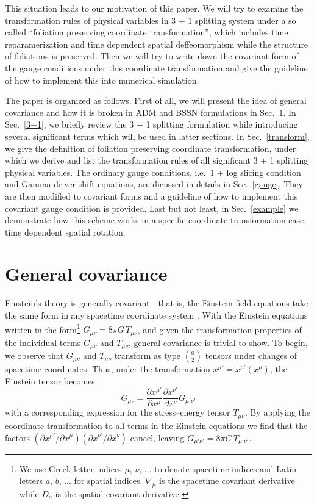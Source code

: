 \documentclass[letterpaper,nofootinbib,prd,amsmath,onecolumn]{revtex4-1}
\begin{document}
This situation leads to our motivation of this paper. We will try to examine the transformation rules of physical variables in 3 + 1 splitting system under a so called ``foliation preserving coordinate transformation'', which includes time reparamerization and time dependent spatial deffeomorphism while the structure of foliations is preserved. Then we will try to write down the covariant form of the gauge conditions under this coordinate transformation and give the guideline of how to implement this into numerical simulation. 

The paper is organized as follows. First of all, we will present the idea of general covariance and how it is broken in ADM and BSSN formulations in Sec.~\ref{covariance}. In Sec.~\ref{3+1}, we briefly review the 3 + 1 splitting formulation while introducing several significant terms which will be used in latter sections. In Sec.~\ref{transform}, we give the definition of foliation preserving coordinate transformation, under which we derive and list the transformation rules of all significant 3 + 1 splitting physical variables. The ordinary gauge conditions, i.e.~1 + log slicing condition and Gamma-driver shift equations, are dicussed in details in Sec.~\ref{gauge}. They are then modified to covariant forms and a guideline of how to implement this covariant gauge condition is provided. Last but not least, in Sec.~\ref{example} we demonstrate how this scheme works in a specific coordinate transformation case, time dependent spatial rotation.
\section{General covariance}\label{covariance}
Einstein's theory is generally covariant---that is, the Einstein field equations take the same 
form in any spacetime coordinate system \cite{Weinberg, Wald}. With the 
Einstein equations written in the form\footnote{We use Greek letter indices $\mu$, $\nu$, ... to denote spacetime indices and Latin 
letters $a$, $b$, ... for spatial indices. $\nabla_{\mu}$ is the spacetime covariant derivative while $D_{a}$ is the spatial 
covariant derivative.} $G_{\mu\nu} = 8\pi G\, T_{\mu\nu}$, and given the transformation properties 
of the individual terms $G_{\mu\nu}$ and $T_{\mu\nu}$, general covariance is trivial to show. To begin, we observe that 
$G_{\mu\nu}$ and $T_{\mu\nu}$ transform as type $0\choose 2$ tensors under changes of spacetime coordinates. Thus, under the  
transformation $x^{\mu'} = x^{\mu'}\left(x^\mu\right)$, the Einstein tensor becomes
\begin{equation}
	G_{\mu\nu} = \frac{\partial x^{\mu'}}{\partial x^{\mu}} \frac{\partial x^{\nu'}}{\partial x^{\nu}} G_{\mu'\nu'} 
\end{equation}
with a corresponding expression for the stress--energy tensor $T_{\mu\nu}$. By applying the coordinate transformation 
to all terms in the Einstein equations we find that the factors 
$\left(\partial x^{\mu'}/\partial x^{\mu}\right) \left(\partial x^{\nu'}/\partial x^{\nu}\right)$
cancel, leaving $G_{\mu'\nu'} = 8\pi G\, T_{\mu'\nu'}$. 
\end{document}
